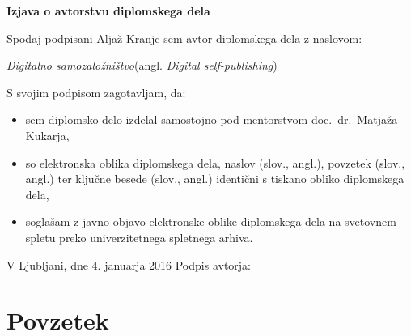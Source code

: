 \documentclass[a4paper, 12pt]{book}
\newcommand{\clearemptydoublepage}{\newpage{\pagestyle{empty}\cleardoublepage}}
\begin{document}
\vspace{2cm}

\clearemptydoublepage

\vspace*{1cm}
\begin{center}
	{\Large \textbf{\sc Izjava o avtorstvu diplomskega dela}}
\end{center}

\vspace{1cm}
\noindent Spodaj podpisani Aljaž Kranjc sem avtor diplomskega dela z naslovom:

\vspace{0.5cm}
\emph{Digitalno samozaložništvo}\hspace{5mm}(angl. \emph{Digital self-publishing})

\vspace{1.5cm}
\noindent S svojim podpisom zagotavljam, da:
\begin{itemize}
	\item sem diplomsko delo izdelal samostojno pod mentorstvom
	doc.\ dr.\ Matjaža Kukarja,
	
	\item	so elektronska oblika diplomskega dela, naslov (slov., angl.), povzetek (slov., angl.) ter ključne besede (slov., angl.) identični s tiskano obliko diplomskega dela,
	\item soglašam z javno objavo elektronske oblike diplomskega dela na svetovnem spletu preko univerzitetnega spletnega arhiva.	
\end{itemize}

\vspace{1cm}
\noindent V Ljubljani, dne 4. januarja 2016 \hfill Podpis avtorja:

\clearemptydoublepage


\pagestyle{empty}
\def\thepage{}%
\tableofcontents{}

\listoffigures{}

\listoftables{}



\clearemptydoublepage

\chapter*{Povzetek}
\end{document}
